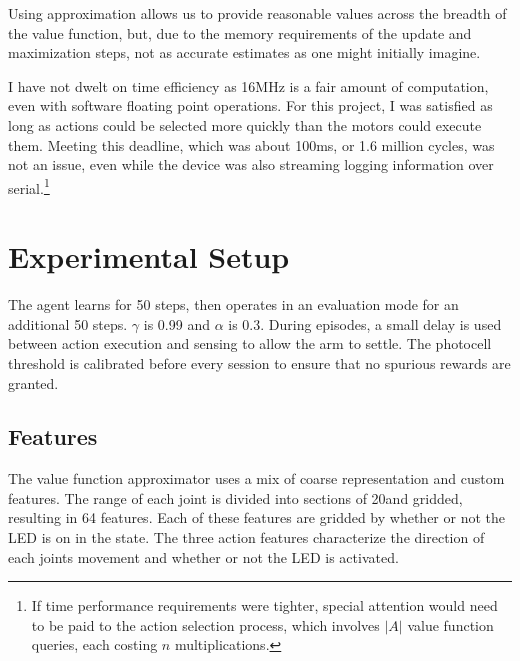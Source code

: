 \documentclass{article}
\begin{document}
	Using approximation allows us to provide reasonable values across the breadth of the value function, but, due to the memory requirements of the update and maximization steps, not as accurate estimates as one might initially imagine.
	
	I have not dwelt on time efficiency as 16MHz is a fair amount of computation, even with software floating point operations. For this project, I was satisfied as long as actions could be selected more quickly than the motors could execute them. Meeting this deadline, which was about 100ms, or 1.6 million cycles, was not an issue, even while the device was also streaming logging information over serial.\footnote{If time performance requirements were tighter, special attention would need to be paid to the action selection process, which involves $|A|$ value function queries, each costing $n$ multiplications.}

	
	
	\section{Experimental Setup}

	The agent learns for 50 steps, then operates in an evaluation mode for an additional 50 steps. $\gamma$ is 0.99 and $\alpha$ is 0.3. During episodes, a small delay is used between action execution and sensing to allow the arm to settle. The photocell threshold is calibrated before every session to ensure that no spurious rewards are granted.
	
	\subsection{Features}

	The value function approximator uses a mix of coarse representation and custom features. The range of each joint is divided into sections of 20\degree and gridded, resulting in 64 features. Each of these features are gridded by whether or not the LED is on in the state. The three action features characterize the direction of each joints movement and whether or not the LED is activated.
	
	
\end{document}
